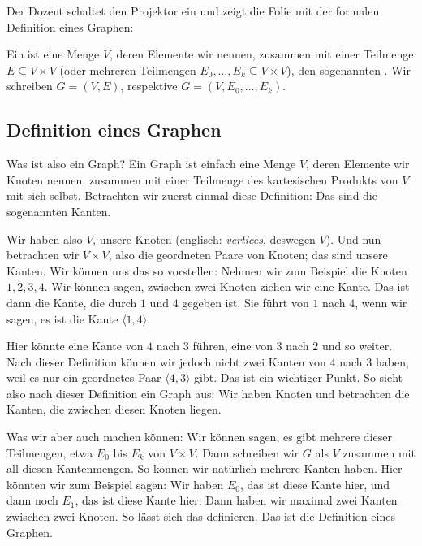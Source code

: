 \begin{meta-note}
Der Dozent schaltet den Projektor ein und zeigt die Folie \textbf{} mit der formalen Definition eines Graphen:
\begin{definition}[Graph]
Ein  ist eine Menge $V$, deren Elemente wir  nennen, zusammen mit einer Teilmenge $E \subseteq V \times V$ (oder mehreren Teilmengen $E_0, \dots, E_k \subseteq V \times V$), den sogenannten . Wir schreiben $G = (V, E)$, respektive $G = (V, E_0, \dots, E_k)$.
\end{definition}
\end{meta-note}

\subsection{Definition eines Graphen}

\begin{spoken-clean}[00:13:36 - 00:16:52]
Was ist also ein Graph? Ein Graph ist einfach eine Menge $V$, deren Elemente wir Knoten nennen, zusammen mit einer Teilmenge des kartesischen Produkts von $V$ mit sich selbst. Betrachten wir zuerst einmal diese Definition: Das sind die sogenannten Kanten.

Wir haben also $V$, unsere Knoten (englisch: \emph{vertices}, deswegen $V$). Und nun betrachten wir $V \times V$, also die geordneten Paare von Knoten; das sind unsere Kanten. Wir können uns das so vorstellen: Nehmen wir zum Beispiel die Knoten $1, 2, 3, 4$. Wir können sagen, zwischen zwei Knoten ziehen wir eine Kante. Das ist dann die Kante, die durch $1$ und $4$ gegeben ist. Sie führt von $1$ nach $4$, wenn wir sagen, es ist die Kante $\langle 1, 4 \rangle$.

Hier könnte eine Kante von $4$ nach $3$ führen, eine von $3$ nach $2$ und so weiter. Nach dieser Definition können wir jedoch nicht zwei Kanten von $4$ nach $3$ haben, weil es nur ein geordnetes Paar $\langle 4, 3 \rangle$ gibt. Das ist ein wichtiger Punkt. So sieht also nach dieser Definition ein Graph aus: Wir haben Knoten und betrachten die Kanten, die zwischen diesen Knoten liegen.

Was wir aber auch machen können: Wir können sagen, es gibt mehrere dieser Teilmengen, etwa $E_0$ bis $E_k$ von $V \times V$. Dann schreiben wir $G$ als $V$ zusammen mit all diesen Kantenmengen. So können wir natürlich mehrere Kanten haben. Hier könnten wir zum Beispiel sagen: Wir haben $E_0$, das ist diese Kante hier, und dann noch $E_1$, das ist diese Kante hier. Dann haben wir maximal zwei Kanten zwischen zwei Knoten. So lässt sich das definieren. Das ist die Definition eines Graphen.
\end{spoken-clean}

